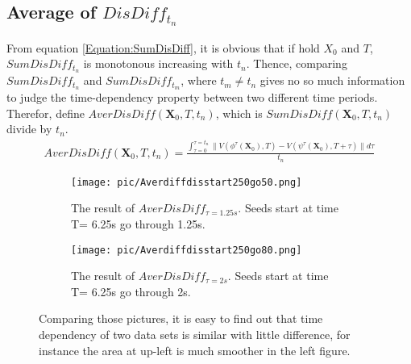 \documentclass[
     11pt,         %
     a4paper,      %
     oneside,
     ]{article}
\newcommand{\vect}[1]{\boldsymbol{#1}}
\begin{document}
\subsection{Average of $DisDiff_{t_{n}}$}
From equation \ref{Equation:SumDisDiff}, it is obvious that if hold $X_{0}$ and $T$, $SumDisDiff_{t_{n}}$ is monotonous increasing with $t_{n}$. Thence, comparing $SumDisDiff_{t_{n}}$ and $SumDisDiff_{t_{m}}$, where $t_{m}\neq t_{n}$ gives no so much information to judge the time-dependency property between two different time periods.\\
Therefor, define \textbf{$AverDisDiff(\vect{X}_{0},T,t_{n})$}, which is $SumDisDiff(\vect{X}_{0},T,t_{n})$ divide by $t_{n}$.
\begin{eqnarray}\label{Equation:AverDisdiff}
	AverDisDiff(\vect{X}_{0},T,t_{n})=\frac{\int_{\tau=0}^{\tau=t_{n}} \lVert V(\phi^{\tau}(\vect{X}_{0}),T)-V(\psi^{\tau}(\vect{X}_{0}),T+\tau)\rVert d\tau}{t_{n}}
\end{eqnarray}

\begin{figure}[H]
	\centering
	\begin{subfigure}{0.45\textwidth}
	   \centering
	   \texttt{[image: pic/Averdiffdisstart250go50.png]}
	   \caption{ The result of $AverDisDiff_{\tau=1.25s}$. Seeds start at time T= 6.25s go through 1.25s.}
	\end{subfigure}	
	\begin{subfigure}{0.45\textwidth}
	    \centering
		\texttt{[image: pic/Averdiffdisstart250go80.png]}
		\caption{ The result of $AverDisDiff_{\tau=2s}$. Seeds start at time T= 6.25s go through 2s.}
	\end{subfigure}	
	\caption{Comparing those pictures, it is easy to find out that time dependency of two data sets is similar with little difference, for instance the area at up-left is much smoother in the left figure.}
	\label{fig:AverDisDiffResult}
\end{figure}	
\end{document}
